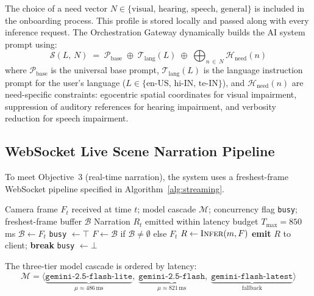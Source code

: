 \documentclass[pdflatex,sn-mathphys-num]{sn-jnl}
\theoremstyle{thmstyleone}%
\theoremstyle{thmstyletwo}%
\theoremstyle{thmstylethree}%
\begin{document}
The choice of a need vector
$N \in \{\text{visual},\,\text{hearing},\,\text{speech},\,\text{general}\}$ is included
in the onboarding process. This profile is stored locally and passed along with every
inference request. The Orchestration Gateway dynamically builds the AI system prompt using:
\begin{equation}
  \mathcal{S}(L,\,N) \;=\;
  \mathcal{P}_{\text{base}}
  \;\oplus\;
  \mathcal{T}_{\text{lang}}(L)
  \;\oplus\;
  \bigoplus_{n\,\in\,N} \mathcal{H}_{\text{need}}(n)
\end{equation}
where $\mathcal{P}_{\text{base}}$ is the universal base prompt,
$\mathcal{T}_{\text{lang}}(L)$ is the language instruction prompt for the user's language ($L \in
\{\text{en-US},\,\text{hi-IN},\,\text{te-IN}\}$), and $\mathcal{H}_{\text{need}}(n)$
are need-specific constraints: egocentric spatial coordinates for visual impairment,
suppression of auditory references for hearing impairment, and verbosity reduction for
speech impairment.

\subsection{WebSocket Live Scene Narration Pipeline}

To meet Objective~3 (real-time narration), the system uses a freshest-frame
WebSocket pipeline specified in Algorithm~\ref{alg:streaming}.

\begin{algorithm}[htbp]
\caption{Freshest-Frame Single-Concurrency Streaming Algorithm}
\label{alg:streaming}
\begin{algorithmic}[1]
\Require Camera frame $F_t$ received at time $t$; model cascade $\mathcal{M}$;
         concurrency flag \texttt{busy}; freshest-frame buffer $\mathcal{B}$
\Ensure  Narration $R_t$ emitted within latency budget $T_{\max} = 850$\,ms
    \State $\mathcal{B} \leftarrow F_t$ 
\Else
    \State \texttt{busy} $\leftarrow \top$
    \State $F \leftarrow \mathcal{B}$ if $\mathcal{B} \neq \emptyset$ else $F_t$
        \State $R \leftarrow \textsc{Infer}(m, F)$
            \State \textbf{emit} $R$ to client; \textbf{break}
        \EndIf
    \EndFor
    \State \texttt{busy} $\leftarrow \bot$
\EndIf
\end{algorithmic}
\end{algorithm}

The three-tier model cascade is ordered by latency:
\begin{equation}
  \mathcal{M} = \langle
    \underbrace{\texttt{gemini-2.5-flash-lite}}_{\mu \approx 486\,\text{ms}},\;
    \underbrace{\texttt{gemini-2.5-flash}}_{\mu \approx 821\,\text{ms}},\;
    \underbrace{\texttt{gemini-flash-latest}}_{\text{fallback}}
  \rangle
\end{equation}
\end{document}
